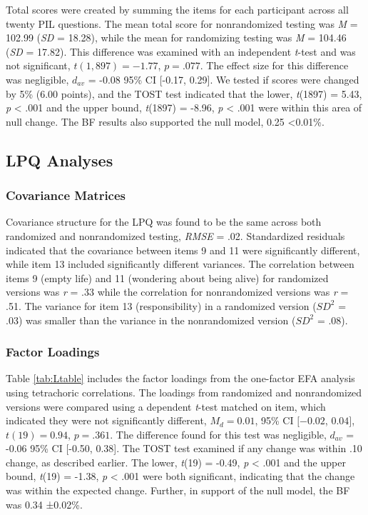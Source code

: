 \documentclass[english,man, mask]{apa6}
\theoremstyle{definition}
\theoremstyle{definition}
\theoremstyle{definition}
\theoremstyle{remark}
\begin{document}
Total scores were created by summing the items for each participant
across all twenty PIL questions. The mean total score for nonrandomized
testing was \emph{M} = 102.99 (\emph{SD} = 18.28), while the mean for
randomizing testing was \emph{M} = 104.46 (\emph{SD} = 17.82). This
difference was examined with an independent \emph{t}-test and was not
significant, \(t(1,897) = -1.77\), \(p = .077\). The effect size for
this difference was negligible, \(d_{av}\) = -0.08 95\% CI {[}-0.17,
0.29{]}. We tested if scores were changed by 5\% (6.00 points), and the
TOST test indicated that the lower, \emph{t}(1897) = 5.43, \emph{p}
\textless{} .001 and the upper bound, \emph{t}(1897) = -8.96, \emph{p}
\textless{} .001 were within this area of null change. The BF results
also supported the null model, 0.25 \textless{}0.01\%.

\subsection{LPQ Analyses}\label{lpq-analyses}

\subsubsection{Covariance Matrices}\label{covariance-matrices-1}

Covariance structure for the LPQ was found to be the same across both
randomized and nonrandomized testing, \emph{RMSE} = .02. Standardized
residuals indicated that the covariance between items 9 and 11 were
significantly different, while item 13 included significantly different
variances. The correlation between items 9 (empty life) and 11
(wondering about being alive) for randomized versions was \emph{r} = .33
while the correlation for nonrandomized versions was \emph{r} = .51. The
variance for item 13 (responsibility) in a randomized version (\(SD^2\)
= .03) was smaller than the variance in the nonrandomized version
(\(SD^2\) = .08).

\subsubsection{Factor Loadings}\label{factor-loadings-1}

Table \ref{tab:Ltable} includes the factor loadings from the one-factor
EFA analysis using tetrachoric correlations. The loadings from
randomized and nonrandomized versions were compared using a dependent
\emph{t}-test matched on item, which indicated they were not
significantly different, \(M_d = 0.01\), 95\% CI \([-0.02\), \(0.04]\),
\(t(19) = 0.94\), \(p = .361\). The difference found for this test was
negligible, \(d_{av}\) = -0.06 95\% CI {[}-0.50, 0.38{]}. The TOST test
examined if any change was within .10 change, as described earlier. The
lower, \emph{t}(19) = -0.49, \emph{p} \textless{} .001 and the upper
bound, \emph{t}(19) = -1.38, \emph{p} \textless{} .001 were both
significant, indicating that the change was within the expected change.
Further, in support of the null model, the BF was 0.34 ±0.02\%.
\end{document}
